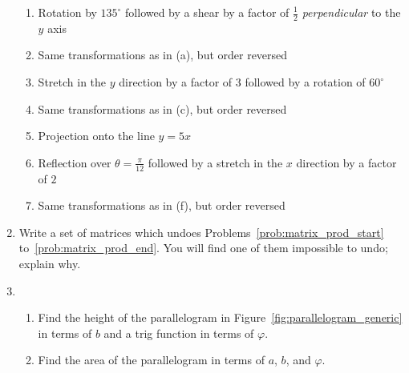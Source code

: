 \documentclass[../gatm.tex]{subfiles}
\begin{document}
\begin{enumerate}
\begin{enumerate}
\item Rotation by $135^\circ$ followed by a shear by a factor of $\frac{1}{2}$ \textit{perpendicular} to the $y$ axis \label{prob:matrix_prod_start}
\item Same transformations as in (a), but order reversed
\item Stretch in the $y$ direction by a factor of $3$ followed by a rotation of $60^\circ$
\item Same transformations as in (c), but order reversed
\item Projection onto the line $y=5x$
\item Reflection over $\theta=\frac{\pi}{12}$ followed by a stretch in the $x$ direction by a factor of $2$
\item Same transformations as in (f), but order reversed \label{prob:matrix_prod_end}
\end{enumerate}
\item Write a set of matrices which undoes Problems~\ref{prob:matrix_prod_start} to~\ref{prob:matrix_prod_end}. You will find one of them impossible to undo; explain why.
\item \begin{enumerate}
\item Find the height of the parallelogram in Figure~\ref{fig:parallelogram_generic} in terms of $b$ and a trig function in terms of $\varphi$.
\item Find the area of the parallelogram in terms of $a$, $b$, and $\varphi$.
\end{enumerate}
\setcounter{problem_i}{\value{enumi}}
\end{enumerate}
\end{document}
